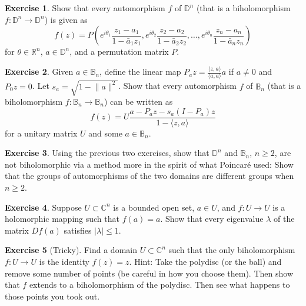 \documentclass[12pt,openany]{book}
\newcommand{\linnprod}[2]{\langle #1 , #2 \rangle}
\newcommand{\sabs}[1]{\lvert {#1} \rvert}
\newcommand{\snorm}[1]{\lVert {#1} \rVert}
\newcommand{\C}{{\mathbb{C}}}
\newcommand{\R}{{\mathbb{R}}}
\newcommand{\D}{{\mathbb{D}}}
\newcommand{\bB}{{\mathbb{B}}}
\theoremstyle{plain}
\theoremstyle{remark}
\theoremstyle{definition}
\newenvironment{exbox}{%
    \def\FrameCommand{\vrule width 1pt \relax\hspace {10pt}}%
    \MakeFramed {\advance \hsize -\width \FrameRestore }%
}{%
    \endMakeFramed
}
\theoremstyle{exercise}
\newtheorem{exercise}{Exercise}[section]
\theoremstyle{example}
\begin{document}
\begin{exbox}
\begin{exercise}
Show that every automorphism $f$ of $\D^n$ (that is a biholomorphism $f \colon \D^n \to \D^n$)
is given as
\begin{equation*}
f(z) = P \left(
e^{i\theta_1} \frac{z_1-a_1}{1-\bar{a}_1z_1} ,
e^{i\theta_2} \frac{z_2-a_2}{1-\bar{a}_2z_2} , \ldots,
e^{i\theta_n} \frac{z_n-a_n}{1-\bar{a}_nz_n} \right)
\end{equation*}
for $\theta \in \R^n$, $a \in \D^n$, and
a permutation matrix $P$.
\end{exercise}

\begin{exercise}
Given $a \in \bB_n$, define the linear map $P_a z =
\frac{\linnprod{z}{a}}{\linnprod{a}{a}}a$ if $a \not= 0$ and $P_0z = 0$.
Let $s_a = \sqrt{1-\snorm{a}^2}$.  Show that every automorphism $f$ of
$\bB_n$ (that is a biholomorphism $f \colon \bB_n \to \bB_n$)
can be written as
\begin{equation*}
f(z) = U \frac{a-P_az-s_a(I-P_a)z}{1-\linnprod{z}{a}}
\end{equation*}
for a unitary matrix $U$ and some $a \in \bB_n$.
\end{exercise}

\begin{exercise}
Using the previous two exercises, show that $\D^n$ and $\bB_n$, $n \geq 2$,
are not biholomorphic via a method more in the spirit of what Poincar\'e
used: Show that the groups of automorphisms of the two domains are
different groups when $n \geq 2$.
\end{exercise}

\begin{exercise} \label{exercise:boundedeigen}
Suppose $U \subset \C^n$ is a bounded open set, $a \in U$, and $f \colon U \to U$ is a
holomorphic mapping such that $f(a) = a$.  Show that every eigenvalue
$\lambda$ of the matrix $Df(a)$ satisfies $\sabs{\lambda} \leq 1$.
\end{exercise}

\begin{exercise}[Tricky]
Find a domain $U \subset \C^n$ such that the only biholomorphism $f \colon U
\to U$ is the identity $f(z) = z$.  Hint: Take the polydisc (or the ball)
and remove some number of points (be careful in how you choose them).  Then
show that $f$ extends to a biholomorphism of the polydisc.  Then see what
happens to those points you took out.
\end{exercise}


\end{exbox}
\end{document}
